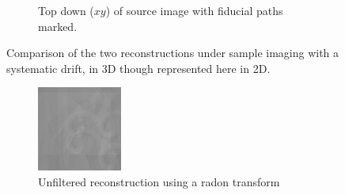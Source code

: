 \begin{figure}
\begin{subfigure}[t]{0.3\textwidth}
    \caption{Top down ($xy$) of source image with fiducial paths marked.}
    \label{fig:topdown_bead_paths}
  \end{subfigure}
    \hfill
    \label{fig:flopts}
  \caption{Comparison of the two reconstructions under sample imaging with a systematic drift, in 3D though represented here in 2D.}
\end{figure}
\begin{figure}
  \centering
  \hfill
  \begin{subfigure}[t]{0.3\textwidth}
    \includegraphics[width=\textwidth]{Chapters/flopt/Figs/PDF/results/helix/unfilttered_reconstruction_helix_iradon}
    \caption{Unfiltered reconstruction using a radon transform}
    \label{fig:unfilttered_reconstruction_helix_iradon}
  \end{subfigure}\hfill
  \begin{subfigure}[t]{0.3\textwidth}

\end{subfigure}
\end{figure}

